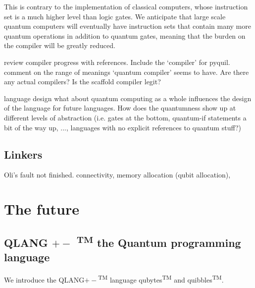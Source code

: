 This is contrary to the implementation of classical computers, whose instruction set is a much higher level than logic gates. We anticipate that large scale quantum computers will eventually have instruction sets that contain many more quantum operations in addition to quantum gates, meaning that the burden on the compiler will be greatly reduced.

review compiler progress with references. Include the `compiler' for pyquil. comment on the range of meanings `quantum compiler' seems to have. Are there any actual compilers? Is the scaffold compiler legit?

language design what about quantum computing as a whole influences the design of the language for future languages. How does the quantumness show up at different levels of abstraction (i.e. gates at the bottom, quantum-if statements a bit of the way up, ..., languages with no explicit references to quantum stuff?)

\subsection{Linkers}

Oli's fault not finished.
connectivity, memory allocation (qubit allocation),  

\section{The future}


\subsection{QLANG $+-$ \textsuperscript{TM} the Quantum programming language}

We introduce the QLANG$+-$\textsuperscript{TM} language qubytes\textsuperscript{TM} and quibbles\textsuperscript{TM}. 
